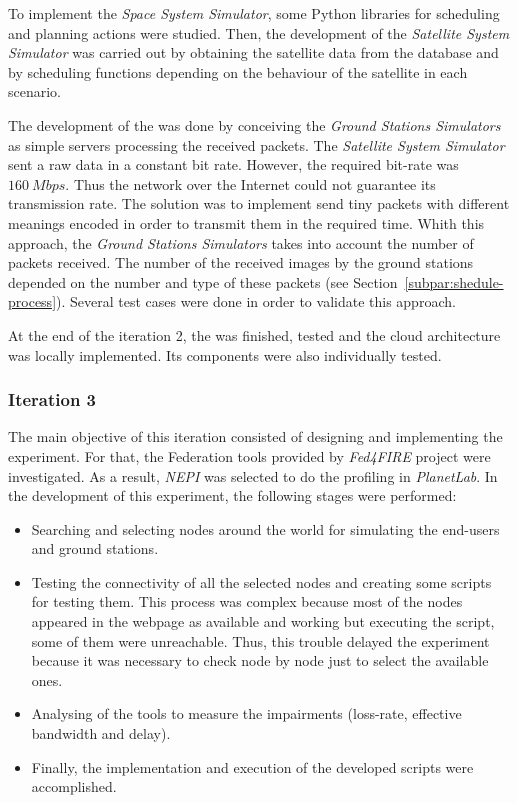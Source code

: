 To implement the \emph{Space System Simulator}, some Python libraries for scheduling and planning
actions were studied. Then, the development of the \emph{Satellite System
  Simulator} was carried out by obtaining the satellite data from the database and
by scheduling functions depending on the behaviour of the satellite in each
scenario.

The development of the \gsss was done by conceiving the \emph{Ground Stations
  Simulators} as simple servers processing the received packets.   
The \emph{Satellite System Simulator}  sent a raw data in a constant
bit rate. However, the required bit-rate was $160~Mbps$. Thus the network over
the Internet could not guarantee its transmission rate. The solution was to
implement send tiny
packets with different meanings encoded in order to transmit them in the
required time.    
Whith this approach, the \emph{Ground Stations
  Simulators} takes into account the number of packets received. The number of
the received images by the ground stations depended on
the number and type of these packets (see Section~\ref{subpar:shedule-process}). Several test cases were done in order to validate
this approach.

At the end of the iteration 2, the \sss was finished, tested and the cloud
architecture was locally implemented. Its components were also individually tested.
 
\subsubsection{Iteration 3}

The main objective of this iteration consisted of designing and implementing  the
\pl experiment. For that, the Federation tools provided by  \emph{Fed4FIRE}
project were investigated. As a result, \emph{NEPI} was selected to do the
profiling  in \emph{PlanetLab}. 
In the development of this experiment, the following stages were performed:
\begin{itemize}
\item Searching and selecting nodes around the world for simulating the
  end-users and ground stations.
\item Testing the connectivity of all the selected nodes and creating some scripts
  for testing them. This process was complex because most of the nodes
  appeared in the \pl webpage as available and working but executing the script,
  some of them were unreachable. Thus, this trouble delayed the experiment
  because it was necessary to check node by node just to select the available ones.
\item Analysing of the tools to measure the impairments (loss-rate, effective
  bandwidth and delay).
\item Finally, the implementation and execution of the developed scripts were accomplished.
\end{itemize}

